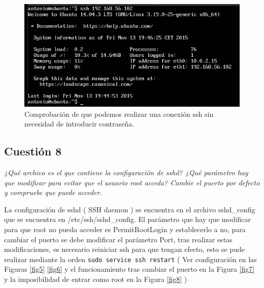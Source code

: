 \begin{figure}[H]
    \begin{center}
        \includegraphics[scale=0.5]{imagenes/img4}
        \caption{Comprobación de que podemos realizar una conexión ssh sin necesidad de introducir contraseña.}
        \label{fig4}
    \end{center}
\end{figure}







\subsection{Cuestión 8}
\textit{¿Qué archivo es el que contiene la configuración de sshd? ¿Qué parámetro hay que modificar para evitar que el usuario root acceda? Cambie el puerto por defecto y compruebe que puede acceder.}
\newline

La configuración de sshd ( SSH daemon ) se encuentra en el archivo sshd\_config que se encuentra en /etc/ssh/sshd\_config. El parámetro que hay que modificar para que root no pueda acceder es PermitRootLogin y establecerlo a no, para cambiar el puerto se debe modificar el parámetro Port, tras realizar estas modificaciones, es necesario reiniciar ssh para que tengan efecto, esto se pude realizar mediante la orden \texttt{sudo service ssh restart} ( Ver configuración en las Figuras \ref{fig5} \ref{fig6} y el funcionamiento tras cambiar el puerto en la Figura \ref{fig7} y la imposibilidad de entrar como root en la Figura \ref{fig8} ) \cite{sshd}

